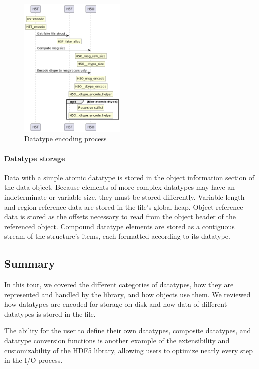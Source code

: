 \begin{figure}
    \centering
    \includegraphics[width=0.45\textwidth]{images/tour_5_uml_datatype_encode.png}
    \caption{Datatype encoding process}
    \label{fig:tour-5-uml-datatype-encode}
\end{figure}

\paragraph{Datatype storage} Data with a simple atomic datatype is stored in the object information section of the data object. Because elements of more complex datatypes may have an indeterminate or variable size, they must be stored differently. Variable-length and region reference data are stored in the file's global heap. Object reference data is stored as the offsets necessary to read from the object header of the referenced object. Compound datatype elements are stored as a contiguous stream of the structure's items, each formatted according to its datatype.

\subsection{Summary}

In this tour, we covered the different categories of datatypes, how they are represented and handled by the library, and how objects use them. We reviewed how datatypes are encoded for storage on disk and how data of different datatypes is stored in the file.

The ability for the user to define their own datatypes, composite datatypes, and datatype conversion functions is another example of the extensibility and customizability of the HDF5 library, allowing users to optimize nearly every step in the I/O process.
